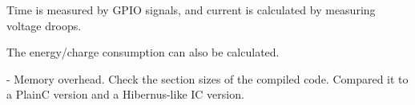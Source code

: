 Time is measured by GPIO signals, and current is calculated by measuring voltage droops. 

The energy/charge consumption can also be calculated. 

- Memory overhead. Check the section sizes of the compiled code. Compared it to a PlainC version and a Hibernus-like IC version.  






